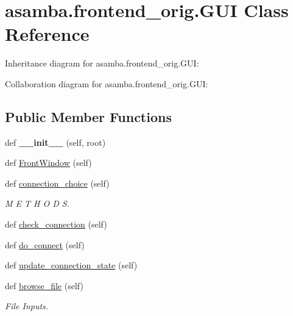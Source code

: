 \hypertarget{classasamba_1_1frontend__orig_1_1_g_u_i}{}\section{asamba.\+frontend\+\_\+orig.\+G\+UI Class Reference}
\label{classasamba_1_1frontend__orig_1_1_g_u_i}


Inheritance diagram for asamba.\+frontend\+\_\+orig.\+G\+UI\+:


Collaboration diagram for asamba.\+frontend\+\_\+orig.\+G\+UI\+:
\subsection*{Public Member Functions}
\begin{DoxyCompactItemize}
\item 
\mbox{\label{classasamba_1_1frontend__orig_1_1_g_u_i_a638a6ee5537927c1f13cdfacb5711168}} 
def {\bfseries \+\_\+\+\_\+init\+\_\+\+\_\+} (self, root)
\item 
def \hyperlink{classasamba_1_1frontend__orig_1_1_g_u_i_a0fd564268af273f977bc8065e26e110b}{Front\+Window} (self)
\item 
def \hyperlink{classasamba_1_1frontend__orig_1_1_g_u_i_af3fdec98d1b3657658a5f489b2246c34}{connection\+\_\+choice} (self)
\begin{DoxyCompactList}\small\item\em M E T H O D S. \end{DoxyCompactList}\item 
def \hyperlink{classasamba_1_1frontend__orig_1_1_g_u_i_ae71ecf0efcb575059e181ccd33f75178}{check\+\_\+connection} (self)
\item 
def \hyperlink{classasamba_1_1frontend__orig_1_1_g_u_i_a68a716eaa1fb6d82a7b004c77a5ab270}{do\+\_\+connect} (self)
\item 
def \hyperlink{classasamba_1_1frontend__orig_1_1_g_u_i_a4a594242291c4ab10089f279073ae8a7}{update\+\_\+connection\+\_\+state} (self)
\item 
def \hyperlink{classasamba_1_1frontend__orig_1_1_g_u_i_a5160be30a39afd49a2dd9ac4aba34d1d}{browse\+\_\+file} (self)
\begin{DoxyCompactList}\small\item\em File Inputs. \end{DoxyCompactList}\item 

\end{DoxyCompactItemize}
